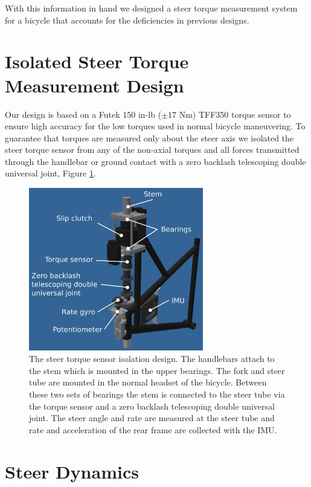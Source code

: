 \documentclass[a4paper]{article}
\begin{document}
With this information in hand we designed a steer torque measurement system for
a bicycle that accounts for the deficiencies in previous designs.

\section*{Isolated Steer Torque Measurement Design}

Our design is based on a Futek 150 in-lb ($\pm 17$ Nm) TFF350 torque sensor
to ensure high accuracy for the low torques used in normal bicycle maneuvering.
To guarantee that torques are measured only about the steer axis we isolated the
steer torque sensor from any of the non-axial torques and all forces
transmitted through the handlebar or ground contact with a zero backlash
telescoping double universal joint, Figure \ref{fig:steer-torque-design}. 

\begin{figure}
  \centering
  \includegraphics[width=3in]{figures/steer-torque-design.png}
  \caption{The steer torque sensor isolation design. The handlebars attach to
    the stem which is mounted in the upper bearings. The fork and steer tube
    are mounted in the normal headset of the bicycle. Between these two sets of
    bearings the stem is connected to the steer tube via the torque sensor and a
    zero backlash telescoping double universal joint. The steer angle and rate
    are measured at the steer tube and rate and acceleration of the rear frame
    are collected with the IMU.}
  \label{fig:steer-torque-design}
\end{figure}

\section*{Steer Dynamics}
\label{sec:steer-dynamics}
\end{document}
